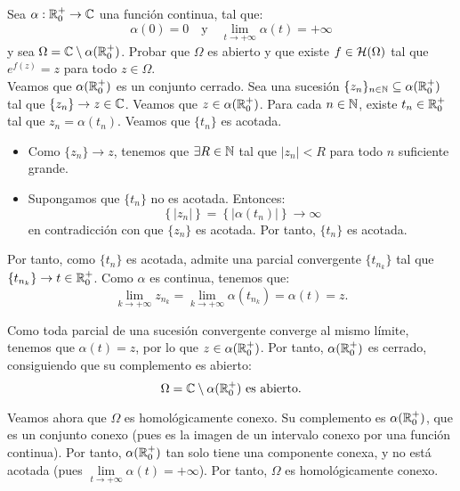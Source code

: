 \begin{ejercicio}
    Sea $\alpha : \mathbb{R}^+_0 \to \mathbb{C}$ una función continua, tal que:
    \begin{equation*}
        \alpha(0) = 0 \quad \text{y} \quad \lim_{t \to +\infty} \alpha(t) = +\infty
    \end{equation*}
    y sea $\Omega = \mathbb{C} \setminus \alpha(\mathbb{R}^+_0)$. Probar que $\Omega$ es abierto y que existe $f \in \mathcal{H}(\Omega)$ tal que $e^{f(z)} = z$ para todo $z \in \Omega$.\\

    Veamos que $\alpha(\mathbb{R}^+_0)$ es un conjunto cerrado. Sea una sucesión $\{z_n\}_{n \in \mathbb{N}} \subseteq \alpha(\mathbb{R}^+_0)$ tal que $\{z_n\}\to z \in \mathbb{C}$. Veamos que $z \in \alpha(\mathbb{R}^+_0)$. Para cada $n \in \mathbb{N}$, existe $t_n \in \mathbb{R}^+_0$ tal que $z_n = \alpha(t_n)$. Veamos que $\{t_n\}$ es acotada.
    \begin{itemize}
        \item Como $\{z_n\}\to z$, tenemos que $\exists R \in \mathbb{N}$ tal que $|z_n|<R$ para todo $n$ suficiente grande.
        \item Supongamos que $\{t_n\}$ no es acotada. Entonces:
        \begin{equation*}
            \left\{|z_n|\right\} = \left\{|\alpha(t_n)|\right\} \to \infty
        \end{equation*}
        en contradicción con que $\{z_n\}$ es acotada. Por tanto, $\{t_n\}$ es acotada.
    \end{itemize}
    Por tanto, como $\{t_n\}$ es acotada, admite una parcial convergente $\{t_{n_k}\}$ tal que $\{t_{n_k}\} \to t \in \mathbb{R}^+_0$. Como $\alpha$ es continua, tenemos que:
    \begin{equation*}
        \lim_{k \to +\infty} z_{n_k} = \lim_{k \to +\infty} \alpha(t_{n_k}) = \alpha(t) = z.
    \end{equation*}

    Como toda parcial de una sucesión convergente converge al mismo límite, tenemos que $\alpha(t) = z$, por lo que $z \in \alpha(\mathbb{R}^+_0)$. Por tanto, $\alpha(\mathbb{R}^+_0)$ es cerrado, consiguiendo que su complemento es abierto:
    \begin{equation*}
        \Omega = \mathbb{C} \setminus \alpha(\mathbb{R}^+_0) \text{ es abierto.}
    \end{equation*}

    Veamos ahora que $\Omega$ es homológicamente conexo. Su complemento es $\alpha(\mathbb{R}^+_0)$, que es un conjunto conexo (pues es la imagen de un intervalo conexo por una función continua). Por tanto, $\alpha(\mathbb{R}^+_0)$ tan solo tiene una componente conexa, y no está acotada (pues $\lim\limits_{t \to +\infty} \alpha(t) = +\infty$). Por tanto, $\Omega$ es homológicamente conexo.


\end{ejercicio}
